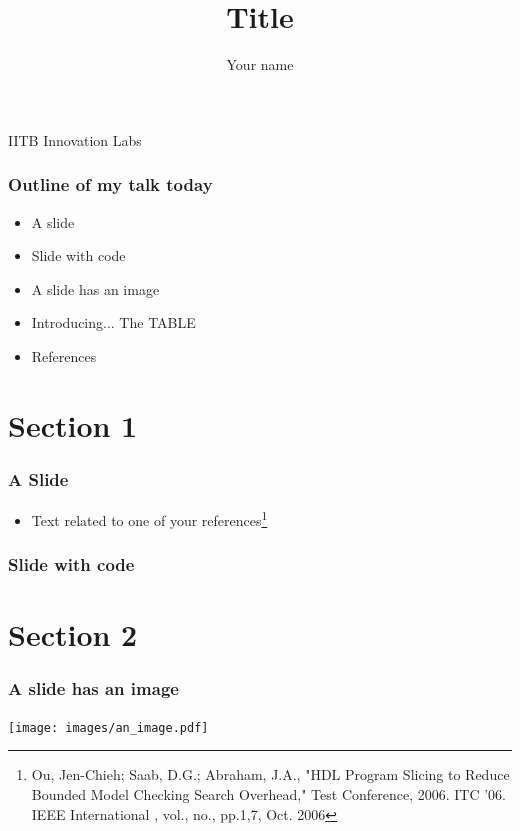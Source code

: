 \documentclass[17pt]{beamer}
\title[title]{Title}
\author{Your name}
\institute
{Course \\Institution}
\date{}
\newcommand\Fontvi{\fontsize{6}{7.2}\selectfont}
\newcommand{\script}[2]{
\Fontvi

}
\begin{document}
\begin{frame}
\titlepage
\vfill
\center IITB Innovation Labs
\end{frame}

\begin{frame}
\frametitle{Outline of my talk today}
\begin{itemize}
\item A slide
\item Slide with code
\item A slide has an image
\item Introducing... The TABLE
\item References
\end{itemize}
\end{frame}

\section{Section 1}
\begin{frame}
\frametitle{A Slide}
\begin{itemize}
\item Text related to one of your references\footnote{Ou, Jen-Chieh; Saab, D.G.; Abraham, J.A., "HDL Program Slicing to Reduce Bounded Model Checking Search Overhead," Test Conference, 2006. ITC '06. IEEE International , vol., no., pp.1,7, Oct. 2006}
\end{itemize}
\end{frame}

\begin{frame}
\frametitle{Slide with code}
\script{code_snippets/a_code}{A sample code}
\end{frame}

\section{Section 2}
\begin{frame}
\frametitle{A slide has an image}
\texttt{[image: images/an\_image.pdf]}
\end{frame}
\end{document}
